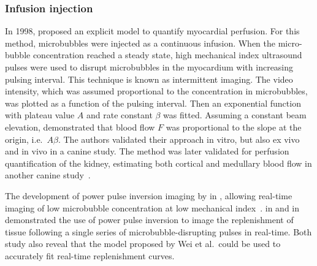 \subsubsection{Infusion injection}
In 1998, \citet{Wei:1998jd} proposed an explicit model to quantify myocardial perfusion. %
For this method, microbubbles were injected as a continuous infusion.
When the micro-bubble concentration reached a steady state, high mechanical index ultrasound pulses were used to disrupt microbubbles in the myocardium with increasing pulsing interval.
This technique is known as intermittent imaging.
The video intensity, which was assumed proportional to the concentration in microbubbles, was plotted as a function of the pulsing interval. 
Then an exponential function with plateau value $A$ and rate constant $\beta$ was fitted. 
Assuming a constant beam elevation, \citet{Wei:1998jd} demonstrated that blood flow $F$ was proportional to the slope at the origin, i.e.~$A\beta$.
The authors validated their approach in vitro, but also ex vivo and in vivo in a canine study.
The method was later validated for perfusion quantification of the kidney, estimating both cortical and medullary blood flow in another canine study~\cite{Wei:2001id}. %

The development of power pulse inversion imaging by \citet{Simpson:1997jn} in \citeyear{Simpson:1997jn}, %
allowing real-time imaging of low microbubble concentration at low mechanical index~\cite{Tiemann:1999vy}. %
\citet{Tiemann:1999vy} in \citeyear{Tiemann:1999vy} %
and \citet{Masugata:2001vg} in \citeyear{Masugata:2001vg} %
demonstrated the use of power pulse inversion to image the replenishment of tissue following a single series of microbubble-disrupting pulses in real-time.
Both study also reveal that the model proposed by Wei et al.~could be used to accurately fit real-time replenishment curves.

